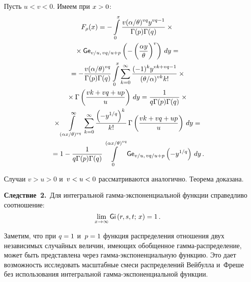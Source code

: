 \begin{multicols}{2}
Пусть $u<v<0$. Имеем при $x\hm>0$:
\begin{multline*}
F_\rho(x)=-\int\limits_0^x
\displaystyle\frac{\displaystyle {v}(\alpha/\theta)^{vq}y^{vq-1}\mathstrut}{\displaystyle \Gamma(p)\Gamma(q)\mathstrut}\times{}\\
{}\times {\sf Ge}_{v/u,\, 
vq/u+p}\left(-\left(\displaystyle\frac{\displaystyle \alpha y\mathstrut}{\displaystyle \theta\mathstrut}\right)^{v}\right)
\, dy={}\\
{}=-\displaystyle\frac{\displaystyle {v}(\alpha/\theta)^{vq}\mathstrut}{\displaystyle \Gamma(p)\Gamma(q)\mathstrut}\int\limits_0^x
\sum\limits_{k=0}^{\infty}\displaystyle\frac{\displaystyle (-1)^ky^{vk+vq-1}\mathstrut}{\displaystyle (\theta/\alpha)^{vk}k!\mathstrut} \times{}\\
{}\times
\Gamma\left(\displaystyle\frac{\displaystyle  vk + vq+up\mathstrut}{\displaystyle u\mathstrut}\right)
\, dy=\displaystyle\frac{\displaystyle 1\mathstrut}{\displaystyle q\Gamma(p)\Gamma(q)\mathstrut}\times{}\\
{}\times \int\limits_{(\alpha x/\theta)^{vq}}^\infty
\sum\limits_{k=0}^{\infty}\displaystyle\frac{\displaystyle \left(-y^{1/q}\right)^{k}\mathstrut}{\displaystyle k!\mathstrut} \,
\Gamma\left(\displaystyle\frac{\displaystyle  vk + vq+up\mathstrut}{\displaystyle u\mathstrut}\right)
\, {dy}={}\\
{}=1-\displaystyle\frac{\displaystyle 1\mathstrut}{\displaystyle q\Gamma(p)\Gamma(q)\mathstrut}\int\limits_0^{(\alpha x/\theta)^{vq}}
{\sf Ge}_{v/u,\, vq/u+p}\left(-y^{1/q}\right)\, {dy}\,.
\end{multline*}

Случаи $v>u>0$ и~$v\hm<u\hm<0$ рассматриваются аналогично. Теорема доказана.

\bigskip

\noindent
\textbf{Следствие~2.}\
Для интегральной гамма-экс\-по\-нен\-ци\-аль\-ной функции справедливо соотношение:
$$
\lim\limits_{x\to\infty}{\sf Gi}\left(r,s,t;\,x\right)=1\,.
$$


\smallskip

Заметим, что при $q\hm=1$ и~$p\hm=1$ функция распределения отношения двух независимых 
случайных величин, имеющих обобщенное гам\-ма-рас\-пре\-де\-ление, может быть 
представлена через гам\-ма-экс\-понен\-ци\-аль\-ную функцию. Это дает возможность\linebreak 
исследовать масштабные смеси распределений Вейбулла и~Фреше без использования 
интегральной гам\-ма-экс\-по\-нен\-ци\-аль\-ной функции.

\bigskip


\end{multicols}
